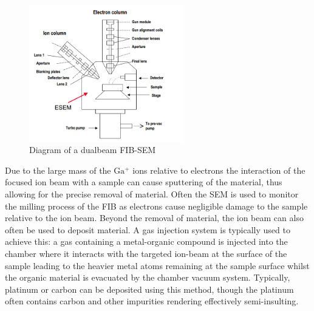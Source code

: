 \begin{figure}[!ht]
	\centering
	\includegraphics[width=0.6\textwidth]{Figs/Ch2/FIB.png}
	\caption[h] {Diagram of a dualbeam FIB-SEM}
	\label{2.8}
\end{figure}
\FloatBarrier

Due to the large mass of the $\mathrm{Ga^{+}}$ ions relative to electrons the interaction of the focused ion beam with a sample can cause sputtering of the material, thus allowing for the precise removal of material. Often the SEM is used to monitor the milling process of the FIB as electrons cause negligible damage to the sample relative to the ion beam. Beyond the removal of material, the ion beam can also often be used to deposit material. A gas injection system  is typically used to achieve this: a gas containing a metal-organic compound is injected into the chamber where it interacts with the targeted ion-beam  at the surface of the sample leading to the heavier metal atoms remaining at the sample surface whilst the organic material is evacuated by the chamber vacuum system. Typically, platinum or carbon can be deposited using this method, though the platinum often contains carbon and other impurities rendering effectively semi-insulting. 

